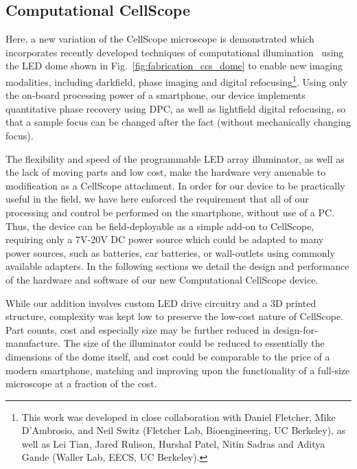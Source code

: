 \subsection{Computational CellScope}\label{sec:fabrication:ccs}
Here, a new variation of the CellScope microscope is demonstrated which incorporates recently developed techniques of computational illumination~\cite{Zheng2011, Tian14, zijiMulti} using the LED dome shown in Fig.~\ref{fig:fabrication_ccs_dome} to enable new imaging modalities, including darkfield, phase imaging and digital refocusing\footnote{This work was developed in close collaboration with Daniel Fletcher, Mike D'Ambrosio, and Neil Switz (Fletcher Lab, Bioengineering, UC Berkeley), as well as Lei Tian, Jared Rulison, Hurshal Patel, Nitin Sadras and Aditya Gande (Waller Lab, EECS, UC Berkeley).}. Using only the on-board processing power of a smartphone, our device implements quantitative phase recovery using DPC, as well as lightfield digital refocusing, so that a sample focus can be changed after the fact (without mechanically changing focus).

The flexibility and speed of the programmable LED array illuminator, as well as the lack of moving parts and low cost, make the hardware very amenable to modification as a CellScope attachment. In order for our device to be practically useful in the field, we have here enforced the requirement that all of our processing and control be performed on the smartphone, without use of a PC. Thus, the device can be field-deployable as a simple add-on to CellScope, requiring only a 7V-20V DC power source which could be adapted to many power sources, such as batteries, car batteries, or wall-outlets using commonly available adapters. In the following sections we detail the design and performance of the hardware and software of our new Computational CellScope device.

While our addition involves custom LED drive circuitry and a 3D printed structure, complexity was kept low to preserve the low-cost nature of CellScope. Part counts, cost and especially size may be further reduced in design-for-manufacture. The size of the illuminator could be reduced to essentially the dimensions of the dome itself, and cost could be comparable to the price of a modern smartphone, matching and improving upon the functionality of a full-size microscope at a fraction of the cost.

